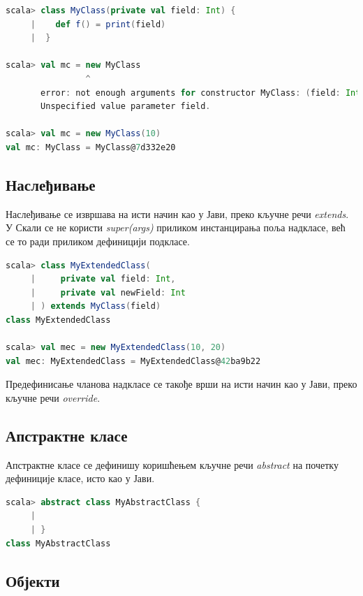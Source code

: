 \documentclass[12pt,oneside]{memoir}
\begin{document}
\begin{lstlisting}[language=Scala]
scala> class MyClass(private val field: Int) {
     |    def f() = print(field)
     |  }

scala> val mc = new MyClass
                ^
       error: not enough arguments for constructor MyClass: (field: Int): MyClass.
       Unspecified value parameter field.
     
scala> val mc = new MyClass(10)
val mc: MyClass = MyClass@7d332e20
\end{lstlisting}

\subsection{Наслеђивање}
\label{subsec:scala_nasled}

Наслеђивање се извршава на исти начин као у Јави, преко кључне речи \textit{extends}. У Скали се не користи \textit{super(args)} приликом инстанцирања поља надкласе, већ се то ради приликом дефиницији подкласе.

\begin{lstlisting}[language=Scala]
scala> class MyExtendedClass(
     |     private val field: Int,
     |     private val newField: Int
     | ) extends MyClass(field)
class MyExtendedClass

scala> val mec = new MyExtendedClass(10, 20)
val mec: MyExtendedClass = MyExtendedClass@42ba9b22
\end{lstlisting}

Предефинисање чланова надкласе се такође врши на исти начин као у Јави, преко кључне речи \textit{override}.

\subsection{Апстрактне класе}
\label{subsec:scala_abs}

Апстрактне класе се дефинишу коришћењем кључне речи \textit{abstract} на почетку дефиниције класе, исто као у Јави.

\begin{lstlisting}[language=Scala]
scala> abstract class MyAbstractClass {
     | 
     | }
class MyAbstractClass
\end{lstlisting}

\subsection{Објекти}
\label{subsec:scala_sing_obj}
\end{document}
